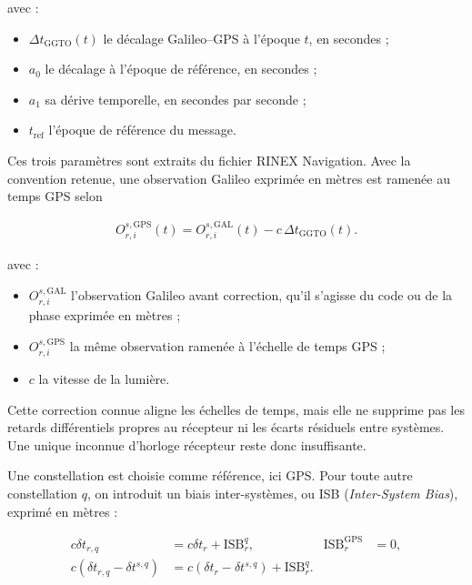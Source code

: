 avec :

\begin{itemize}
    \item $\Delta t_{\mathrm{GGTO}}(t)$ le décalage Galileo--GPS à l'époque
    $t$, en secondes ;
    \item $a_0$ le décalage à l'époque de référence, en secondes ;
    \item $a_1$ sa dérive temporelle, en secondes par seconde ;
    \item $t_{\mathrm{ref}}$ l'époque de référence du message.
\end{itemize}

Ces trois paramètres sont extraits du fichier RINEX Navigation. 
Avec la convention retenue, une observation Galileo
exprimée en mètres est ramenée au temps GPS selon

\begin{align}
O_{r,i}^{s,\mathrm{GPS}}(t)
=
O_{r,i}^{s,\mathrm{GAL}}(t)
-c\,\Delta t_{\mathrm{GGTO}}(t).
\label{eq:ggto_observation_correction}
\end{align}

avec :

\begin{itemize}
    \item $O_{r,i}^{s,\mathrm{GAL}}$ l'observation Galileo avant correction,
    qu'il s'agisse du code ou de la phase exprimée en mètres ;
    \item $O_{r,i}^{s,\mathrm{GPS}}$ la même observation ramenée à l'échelle
    de temps GPS ;
    \item $c$ la vitesse de la lumière.
\end{itemize}

Cette correction connue aligne les échelles de temps, mais elle ne supprime
pas les retards différentiels propres au récepteur ni les écarts résiduels
entre systèmes. Une unique inconnue d'horloge récepteur reste donc
insuffisante.

Une constellation est choisie comme référence, ici GPS. Pour toute autre
constellation $q$, on introduit un biais inter-systèmes, ou ISB
(\textit{Inter-System Bias}), exprimé en mètres :

\begin{align}
c\delta t_{r,q}
&=
c\delta t_r+\mathrm{ISB}_{r}^{q},
&
\mathrm{ISB}_{r}^{\mathrm{GPS}}
&=0,
\\
c\left(\delta t_{r,q}-\delta t^{s,q}\right)
&=
c\left(\delta t_r-\delta t^{s,q}\right)
+\mathrm{ISB}_{r}^{q}.
\label{eq:isb_definition}
\end{align}

